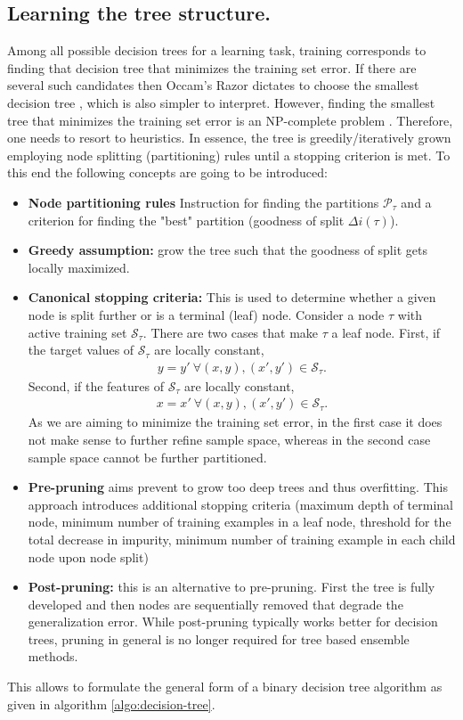 \documentclass[12pt,a4paper]{article}
\begin{document}
\subsection{Learning the tree structure.}
Among all possible decision trees for a learning task, training corresponds to finding that decision tree that minimizes the training set error. If there are several such candidates then Occam's Razor dictates to choose the smallest decision tree \cite{BLUMER1987377}, which is also simpler to interpret. However, finding the smallest tree that minimizes the training set error is an NP-complete problem \cite{HYAFIL197615}. Therefore, one needs to resort to heuristics. In essence, the tree is greedily/iteratively grown employing node splitting (partitioning) rules until a stopping criterion is met. To this end the following concepts are going to be introduced:
\begin{itemize}\itemsep0em 
	\item \textbf{Node partitioning rules} Instruction for finding the partitions $\mathcal P_\tau$ and a criterion for finding the "best" partition (goodness of split $\Delta i(\tau)$).
	\item \textbf{Greedy assumption:} grow the tree such that the goodness of split gets locally maximized.
	\item \textbf{Canonical stopping criteria:} This is used to determine whether a given node is split further or is a terminal (leaf) node. Consider a  node $\tau$ with active training set $\mathcal S_\tau$.  There are two cases that make $\tau$ a leaf node. First, if the target values of $\mathcal S_\tau$ are locally constant,
	\begin{align}
		y = y' ~  \forall (x,y), (x',y') \in  \mathcal S_\tau.
	\end{align}
	Second, if the features of $\mathcal S_\tau$ are locally constant,
	\begin{align}
	x = x' ~  \forall (x,y), (x',y') \in  \mathcal S_\tau.
	\end{align}
	As we are aiming to minimize the training set error, in the first case it does not make sense to further refine sample space, whereas in the second case sample space cannot be further partitioned.
	\item \textbf{Pre-pruning} aims prevent to grow too deep trees and thus overfitting. This approach introduces additional stopping criteria (maximum depth of terminal node, minimum number of training examples in a leaf node, threshold for the total decrease in impurity, minimum number of training example in each child node upon node split)
	\item \textbf{Post-pruning:} this is an alternative to pre-pruning. First the tree is fully developed and then nodes are sequentially removed that degrade the generalization error. While post-pruning typically works better for decision  trees, pruning in general is no longer required for tree based ensemble methods. 
\end{itemize}
This allows to formulate the general form of a binary decision tree algorithm as given in algorithm \ref{algo:decision-tree}.
\end{document}
